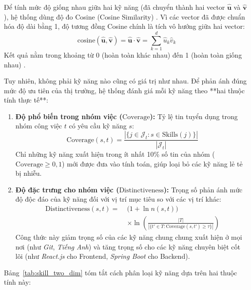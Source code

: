 Để tính mức độ giống nhau giữa hai kỹ năng (đã chuyển thành hai vector $\hat{\mathbf{u}}$ và $\hat{\mathbf{v}}$), hệ thống dùng độ đo Cosine (Cosine Similarity) \cite{reimers2019}. Vì các vector đã được chuẩn hóa độ dài bằng 1, độ tương đồng Cosine chính là tích vô hướng giữa hai vector:
\begin{equation}
    \text{cosine}(\hat{\mathbf{u}}, \hat{\mathbf{v}}) = \hat{\mathbf{u}} \cdot \hat{\mathbf{v}} = \sum_{k=1}^{d} \hat{u}_k \hat{v}_k
\end{equation}
Kết quả nằm trong khoảng từ 0 (hoàn toàn khác nhau) đến 1 (hoàn toàn giống nhau) \cite{minilmmodel}.

Tuy nhiên, không phải kỹ năng nào cũng có giá trị như nhau. Để phản ánh đúng mức độ ưu tiên của thị trường, hệ thống đánh giá mỗi kỹ năng theo **hai thuộc tính thực tế**:

\begin{enumerate}
    \item \textbf{Độ phổ biến trong nhóm việc ($\text{Coverage}$):} Tỷ lệ tin tuyển dụng trong nhóm công việc $t$ có yêu cầu kỹ năng $s$:
    \begin{equation}
        \text{Coverage}(s, t) = \frac{|\{j \in \mathcal{J}_t : s \in \text{Skills}(j)\}|}{|\mathcal{J}_t|}
    \end{equation}
    Chỉ những kỹ năng xuất hiện trong ít nhất 10\% số tin của nhóm ($\text{Coverage} \ge 0{,}1$) mới được đưa vào tính toán, giúp loại bỏ các kỹ năng lẻ tẻ bị nhiễu.

    \item \textbf{Độ đặc trưng cho nhóm việc ($\text{Distinctiveness}$):} Trọng số phản ánh mức độ độc đáo của kỹ năng đối với vị trí mục tiêu so với các vị trí khác:
    \begin{equation}
    \begin{aligned}
        \text{Distinctiveness}(s, t) = \; & \bigl(1 + \ln n(s,t)\bigr) \\
        & \times \ln\!\left(\frac{|T|}{|\{t' \in T : \text{Coverage}(s,t') \geq \tau\}|}\right)
    \end{aligned}
    \end{equation}
    Công thức này giảm trọng số của các kỹ năng chung chung xuất hiện ở mọi nơi (như \textit{Git}, \textit{Tiếng Anh}) và tăng trọng số cho các kỹ năng chuyên biệt cốt lõi (như \textit{React.js} cho Frontend, \textit{Spring Boot} cho Backend).
\end{enumerate}

Bảng~\ref{tab:skill_two_dim} tóm tắt cách phân loại kỹ năng dựa trên hai thuộc tính này:

